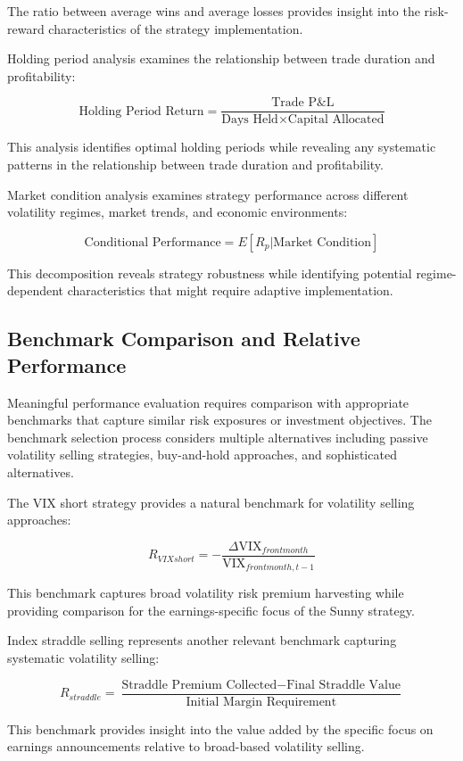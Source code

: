\documentclass[
  american,
  11pt,
  11pt,
  letterpaper,
  onecolumn]{article}
\begin{document}
The ratio between average wins and average losses provides insight into
the risk-reward characteristics of the strategy implementation.

Holding period analysis examines the relationship between trade duration
and profitability:

\[\text{Holding Period Return} = \frac{\text{Trade P\&L}}{\text{Days Held} \times \text{Capital Allocated}}\]

This analysis identifies optimal holding periods while revealing any
systematic patterns in the relationship between trade duration and
profitability.

Market condition analysis examines strategy performance across different
volatility regimes, market trends, and economic environments:

\[\text{Conditional Performance} = E[R_p | \text{Market Condition}]\]

This decomposition reveals strategy robustness while identifying
potential regime-dependent characteristics that might require adaptive
implementation.

\subsection{Benchmark Comparison and Relative
Performance}\label{benchmark-comparison-and-relative-performance}

Meaningful performance evaluation requires comparison with appropriate
benchmarks that capture similar risk exposures or investment objectives.
The benchmark selection process considers multiple alternatives
including passive volatility selling strategies, buy-and-hold
approaches, and sophisticated alternatives.

The VIX short strategy provides a natural benchmark for volatility
selling approaches:

\[R_{VIX short} = -\frac{\Delta \text{VIX}_{front month}}{\text{VIX}_{front month, t-1}}\]

This benchmark captures broad volatility risk premium harvesting while
providing comparison for the earnings-specific focus of the Sunny
strategy.

Index straddle selling represents another relevant benchmark capturing
systematic volatility selling:

\[R_{straddle} = \frac{\text{Straddle Premium Collected} - \text{Final Straddle Value}}{\text{Initial Margin Requirement}}\]

This benchmark provides insight into the value added by the specific
focus on earnings announcements relative to broad-based volatility
selling.
\end{document}

